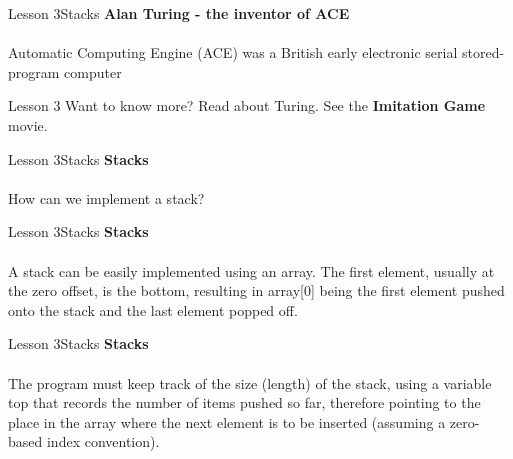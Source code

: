 \documentclass[aspectratio=1610]{beamer}
\begin{document}
\begin{frame}
\end{frame}


\begin{frame}{Lesson 3}{Stacks}
\LARGE
\textbf{Alan Turing - the inventor of ACE}\\~\\
Automatic Computing Engine (ACE) was a British early electronic
serial stored-program computer
\end{frame}


\begin{frame}
\end{frame}

\begin{frame}{Lesson 3}{}
\Huge
 Want to know more? Read about Turing. See the \textbf{Imitation Game}
 movie.
 \end{frame}
 

\begin{frame}
\end{frame}



\begin{frame}{Lesson 3}{Stacks}
\Huge 
\textbf{Stacks}\\~\\
How can we implement a stack? 
\end{frame}


\begin{frame}{Lesson 3}{Stacks}
\LARGE
\textbf{Stacks}\\~\\
A stack can be easily implemented using an array. The first
element, usually at the zero offset, is the bottom, resulting in
array[0] being the first element pushed onto the stack and the last
element popped off. 
\end{frame}

\begin{frame}{Lesson 3}{Stacks}
\LARGE
\textbf{Stacks}\\~\\
The program must keep track of the size (length) of the stack, using a variable 
top that records the number of items pushed so far, therefore pointing to the 
place in the array where the next element is to be inserted (assuming a zero-based 
index convention).
\end{frame}
\end{document}
